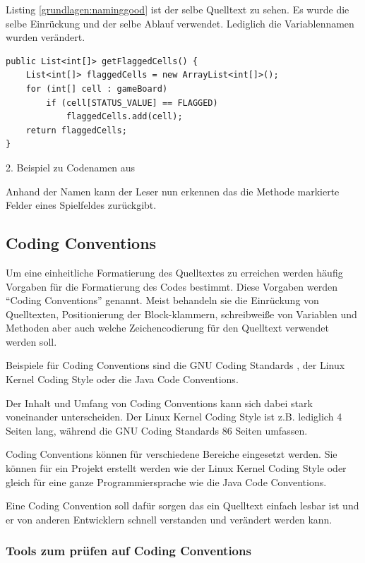Listing \ref{grundlagen:naminggood} ist der selbe Quelltext zu sehen.
Es wurde die selbe Einrückung und der selbe Ablauf verwendet. Lediglich
die Variablennamen wurden verändert.

\begin{listing}
    \begin{verbatim}
public List<int[]> getFlaggedCells() {
    List<int[]> flaggedCells = new ArrayList<int[]>();
    for (int[] cell : gameBoard)
        if (cell[STATUS_VALUE] == FLAGGED)
            flaggedCells.add(cell);
    return flaggedCells;
}
    \end{verbatim}
    \caption{2. Beispiel zu Codenamen aus \cite[S. 47]{Martin}}
    \label{grundlagen:naminggood}
\end{listing}

Anhand der Namen kann der Leser nun erkennen das die Methode markierte Felder eines Spielfeldes zurückgibt.

\subsection{Coding Conventions}

Um eine einheitliche Formatierung des Quelltextes zu erreichen werden häufig
Vorgaben für die Formatierung des Codes bestimmt. Diese Vorgaben werden
\enquote{Coding Conventions} genannt. Meist behandeln sie die Einrückung von Quelltexten,
Positionierung der Block-klammern, schreibweiße von Variablen und Methoden aber auch
welche Zeichencodierung für den Quelltext verwendet werden soll.

Beispiele für Coding Conventions sind die GNU Coding Standards \cite{GNUCode},
der Linux Kernel Coding Style\cite{KernelCode} oder die Java Code Conventions\cite{javacode}.

Der Inhalt und Umfang von Coding Conventions kann sich dabei stark voneinander
unterscheiden. Der Linux Kernel Coding Style ist z.B. lediglich 4 Seiten lang,
während die GNU Coding Standards 86 Seiten umfassen.

Coding Conventions können für verschiedene Bereiche eingesetzt werden. Sie können für
ein Projekt erstellt werden wie der Linux Kernel Coding Style oder gleich für eine
ganze Programmiersprache wie die Java Code Conventions.

Eine Coding Convention soll dafür sorgen das ein Quelltext einfach lesbar ist
und er von anderen Entwicklern schnell verstanden und verändert werden kann.

\subsubsection{Tools zum prüfen auf Coding Conventions}

